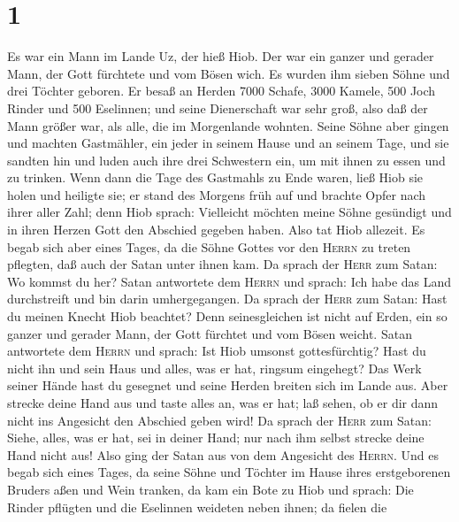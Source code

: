 \hypertarget{section}{%
\section{1}\label{section}}

 Es war ein Mann im Lande Uz, der hieß Hiob. Der war ein
ganzer und gerader Mann, der Gott fürchtete und vom Bösen wich.
 Es wurden ihm sieben Söhne und drei Töchter geboren.
 Er besaß an Herden 7000 Schafe, 3000 Kamele, 500 Joch
Rinder und 500 Eselinnen; und seine Dienerschaft war sehr groß, also daß
der Mann größer war, als alle, die im Morgenlande wohnten.
 Seine Söhne aber gingen und machten Gastmähler, ein jeder
in seinem Hause und an seinem Tage, und sie sandten hin und luden auch
ihre drei Schwestern ein, um mit ihnen zu essen und zu trinken.
 Wenn dann die Tage des Gastmahls zu Ende waren, ließ Hiob
sie holen und heiligte sie; er stand des Morgens früh auf und brachte
Opfer nach ihrer aller Zahl; denn Hiob sprach: Vielleicht möchten meine
Söhne gesündigt und in ihren Herzen Gott den Abschied gegeben haben.
Also tat Hiob allezeit.  Es begab sich aber eines Tages,
da die Söhne Gottes vor den \textsc{Herrn} zu treten pflegten, daß auch
der Satan unter ihnen kam.  Da sprach der \textsc{Herr}
zum Satan: Wo kommst du her? Satan antwortete dem \textsc{Herrn} und
sprach: Ich habe das Land durchstreift und bin darin umhergegangen.
 Da sprach der \textsc{Herr} zum Satan: Hast du meinen
Knecht Hiob beachtet? Denn seinesgleichen ist nicht auf Erden, ein so
ganzer und gerader Mann, der Gott fürchtet und vom Bösen weicht.
 Satan antwortete dem \textsc{Herrn} und sprach: Ist Hiob
umsonst gottesfürchtig?  Hast du nicht ihn und sein Haus
und alles, was er hat, ringsum eingehegt? Das Werk seiner Hände hast du
gesegnet und seine Herden breiten sich im Lande aus. 
Aber strecke deine Hand aus und taste alles an, was er hat; laß sehen,
ob er dir dann nicht ins Angesicht den Abschied geben wird!
 Da sprach der \textsc{Herr} zum Satan: Siehe, alles, was
er hat, sei in deiner Hand; nur nach ihm selbst strecke deine Hand nicht
aus! Also ging der Satan aus von dem Angesicht des \textsc{Herrn}.
 Und es begab sich eines Tages, da seine Söhne und
Töchter im Hause ihres erstgeborenen Bruders aßen und Wein tranken,
 da kam ein Bote zu Hiob und sprach: Die Rinder pflügten
und die Eselinnen weideten neben ihnen;  da fielen die
